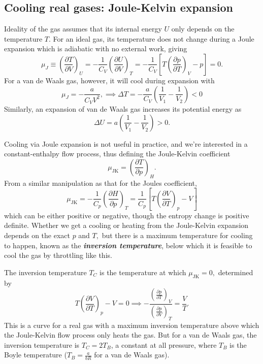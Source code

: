\documentclass{article}
\theoremstyle{nonumberplain}
\begin{document}
\subsection{Cooling real gases: Joule-Kelvin expansion}
Ideality of the gas assumes that its internal energy $U$ only depends on the temperature $T$. For an ideal gas, its temperature does not change during a Joule expansion which is adiabatic with no external work, giving 
\[
    \boxed{
    \mu_J \equiv \left(\frac{\partial T}{\partial V} \right)_U 
    = -\frac{1}{C_V} \left( \frac{\partial U}{\partial V} \right)_T}
    = -\frac{1}{C_V} \left[ T \left(\frac{\partial p}{\partial T} \right)_V - p\right]= 0.
\]
For a van de Waals gas, however, it will cool during expansion with 
\[
    \mu_J = -\frac{a}{C_V V^2}, \implies \Delta T = -\frac{a}{C_V} \left( \frac{1}{V_1} - \frac{1}{V_2}\right) <0
\]
Similarly, an  expansion of van de Waals gas increases its potential energy as 
\[
    \Delta U = a \left(\frac{1}{V_1} - \frac{1}{V_2}\right) >0.
\]

Cooling via Joule expansion is not useful in practice, and we're interested in a constant-enthalpy flow process, thus defining the Joule-Kelvin coefficient 
\[
    \mu_{\mathrm{JK}} = \left(\frac{\partial T}{\partial p}\right)_H. 
\]
From a similar manipulation as that for the Joules coefficient, 
\[
    \mu_{\mathrm{JK}} = -\frac{1}{C_p} \left(\frac{\partial H}{\partial p} \right)_T
    = \frac{1}{C_p} \left[ T\left(\frac{\partial V}{\partial T} \right)_p - V\right]
\]
which can be either positive or negative, though the entropy change is positive definite. Whether we get a cooling or heating from the Joule-Kelvin expansion depends on the exact $p$ and $T,$ but there is a maximum temperature for cooling to happen, known as the \textit{\textbf{inversion temperature}}, below which it is feasible to cool the gas by throttling like this.  

The inversion temperature $T_C$ is the temperature at which $\mu_{\mathrm{JK} } =0,$ determined by 
\[
    T \left( \frac{\partial V}{\partial T} \right)_{p} - V= 0
    \implies 
    -\frac{\left( \frac{\partial p}{\partial T} \right)_{V} }{\left( \frac{\partial p}{\partial V} \right)_{T} } = \frac{V}{T}.
\] 
This is a curve for a real gas with a maximum inversion temperature above which the Joule-Kelvin flow process only heats the gas. But for a van de Waals gas, the inversion temperature is $T_C = 2 T_B$, a constant at all pressure, where $T_B$ is the Boyle temperature ($T_B = \frac{a}{b R}$ for a van de Waals gas).
\end{document}
